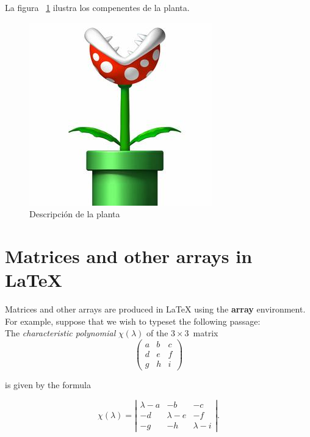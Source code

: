         La figura ~\ref{fig:planta}    %
        ilustra los compenentes de la planta.

        \begin{figure}
          \centering
            \includegraphics[scale=0.5]{Apendice1/figs/planta.jpg}      %
            \caption{Descripción de la planta}            %
            \label{fig:planta}                            %
        \end{figure}
        
        \section{Matrices and other arrays in \LaTeX}
            Matrices and other arrays are produced in LaTeX using the \textbf{array} environment. For example, suppose that we wish to typeset the following passage:\\
            The \emph{characteristic polynomial} $\chi(\lambda)$ of the $3 \times 3
            $~matrix
            \[ \left( 
                \begin{array}{ccc}
                    a & b & c \\
                    d & e & f \\
                    g & h & i \end{array} \right)\]


        is given by the formula


            \[ \chi(\lambda) = \left| \begin{array}{ccc}
            \lambda - a & -b & -c \\
            -d & \lambda - e & -f \\
            -g & -h & \lambda - i \end{array} \right|.\] 
            
